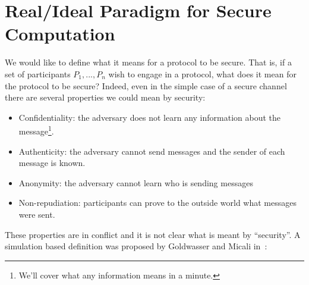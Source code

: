 \documentclass{article}
\begin{document}
\section{Real/Ideal Paradigm for Secure Computation}
We would like to define what it means for a protocol to be secure.  That is, if a set of participants $P_1,..., P_n$ wish to engage in a protocol, what does it mean for the protocol to be secure?  Indeed, even in the simple case of a secure channel there are several properties we could mean by security:
\begin{itemize}
\item Confidentiality: the adversary does not learn any information about the message\footnote{We'll cover what any information means in a minute.}.
\item Authenticity: the adversary cannot send messages and the sender of each message is known.
\item Anonymity: the adversary cannot learn who is sending messages
\item Non-repudiation: participants can prove to the outside world what messages were sent.
\end{itemize}
These properties are in conflict and it is not clear what is meant by ``security''.  A simulation based definition was proposed by Goldwasser and Micali in~\cite{goldwasserMicali}:
\end{document}
